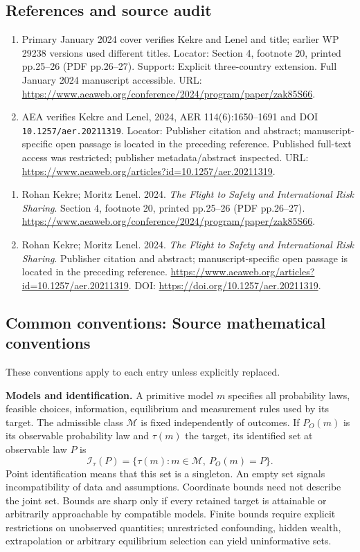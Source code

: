 \documentclass[11pt,a4paper]{article}
\begin{document}
\subsection*{References and source audit}
\begin{enumerate}
\item Primary January 2024 cover verifies Kekre and Lenel and title; earlier WP 29238 versions used different titles. Locator: Section 4, footnote 20, printed pp.25--26 (PDF pp.26--27). Support: Explicit three-country extension. Full January 2024 manuscript accessible. URL: \url{https://www.aeaweb.org/conference/2024/program/paper/zak85S66}.
\item AEA verifies Kekre and Lenel, 2024, AER 114(6):1650--1691 and DOI \nolinkurl{10.1257/aer.20211319}. Locator: Publisher citation and abstract; manuscript-specific open passage is located in the preceding reference. Published full-text access was restricted; publisher metadata/abstract inspected. URL: \url{https://www.aeaweb.org/articles?id=10.1257/aer.20211319}.
\end{enumerate}
\begin{enumerate}\raggedright
\item\hypertarget{definitions:source:30007617:1}{} Rohan Kekre; Moritz Lenel. 2024. \emph{The Flight to Safety and International Risk Sharing}. Section 4, footnote 20, printed pp.25--26 (PDF pp.26--27).
\url{https://www.aeaweb.org/conference/2024/program/paper/zak85S66}.
\item\hypertarget{definitions:source:30007617:2}{} Rohan Kekre; Moritz Lenel. 2024. \emph{The Flight to Safety and International Risk Sharing}. Publisher citation and abstract; manuscript-specific open passage is located in the preceding reference.
\url{https://www.aeaweb.org/articles?id=10.1257/aer.20211319}.
DOI: \url{https://doi.org/10.1257/aer.20211319}.
\end{enumerate}

\subsection*{Common conventions: Source mathematical conventions}

These conventions apply to each entry unless explicitly replaced.

\textbf{Models and identification.} A primitive model \(m\) specifies all probability laws, feasible choices, information, equilibrium and measurement rules used by its target. The admissible class \(\mathcal M\) is fixed independently of outcomes. If \(P_O(m)\) is its observable probability law and \(\tau(m)\) the target, its identified set at observable law \(P\) is
\[
 \mathcal I_\tau(P)=\{\tau(m):m\in\mathcal M,\ P_O(m)=P\}.
\]
Point identification means that this set is a singleton. An empty set signals incompatibility of data and assumptions. Coordinate bounds need not describe the joint set. Bounds are sharp only if every retained target is attainable or arbitrarily approachable by compatible models. Finite bounds require explicit restrictions on unobserved quantities; unrestricted confounding, hidden wealth, extrapolation or arbitrary equilibrium selection can yield uninformative sets.
\end{document}
